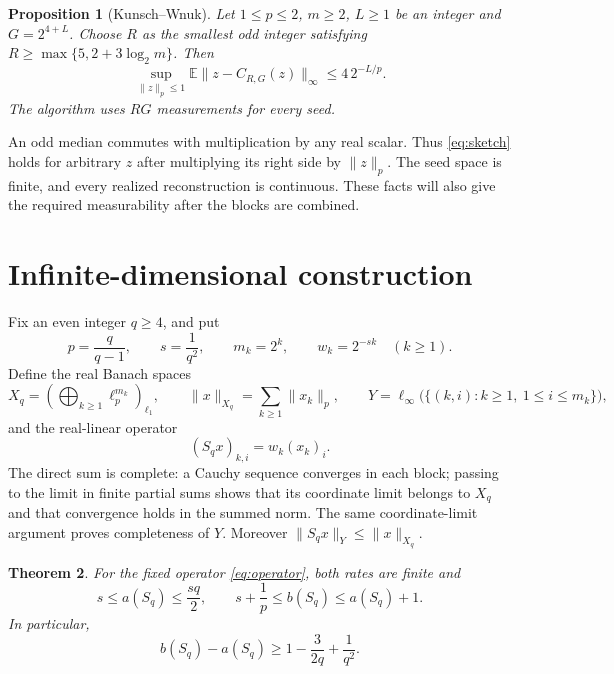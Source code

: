 \documentclass[11pt]{article}
\newtheorem{theorem}{Theorem}
\newtheorem{proposition}[theorem]{Proposition}
\newcommand{\E}{\mathbb E}
\begin{document}
\begin{proposition}[Kunsch--Wnuk]\label{prop:sketch}
Let \(1\le p\le2\), \(m\ge2\), \(L\ge1\) be an integer and \(G=2^{4+L}\).
Choose \(R\) as the smallest odd integer satisfying
\(R\ge\max\{5,2+3\log_2m\}\). Then
\begin{equation}\label{eq:sketch}
 \sup_{\|z\|_p\le1}\E\|z-C_{R,G}(z)\|_\infty
       \le4\,2^{-L/p}.
\end{equation}
The algorithm uses \(RG\) measurements for every seed.
\end{proposition}

An odd median commutes with multiplication by any real scalar.
Thus \eqref{eq:sketch} holds for arbitrary \(z\) after multiplying its
right side by \(\|z\|_p\). The seed space is finite, and every realized
reconstruction is continuous. These facts will also give the required
measurability after the blocks are combined.

\section{Infinite-dimensional construction}

Fix an even integer \(q\ge4\), and put
\[
 p=\frac q{q-1},\qquad s=\frac1{q^2},\qquad
 m_k=2^k,\qquad w_k=2^{-sk}\quad(k\ge1).
\]
Define the real Banach spaces
\[
 X_q=\left(\bigoplus_{k\ge1}\ell_p^{m_k}\right)_{\ell_1},
 \qquad \|x\|_{X_q}=\sum_{k\ge1}\|x_k\|_p,
 \qquad
 Y=\ell_\infty\bigl(\{(k,i):k\ge1,\ 1\le i\le m_k\}\bigr),
\]
and the real-linear operator
\begin{equation}\label{eq:operator}
 (S_qx)_{k,i}=w_k(x_k)_i.
\end{equation}
The direct sum is complete: a Cauchy sequence converges in each block;
passing to the limit in finite partial sums shows that its coordinate
limit belongs to \(X_q\) and that convergence holds in the summed norm.
The same coordinate-limit argument proves completeness of \(Y\).
Moreover \(\|S_qx\|_Y\le\|x\|_{X_q}\).

\begin{theorem}\label{thm:rates}
For the fixed operator \eqref{eq:operator}, both rates are finite and
\begin{equation}\label{eq:rates}
 s\le a(S_q)\le\frac{sq}{2},
 \qquad
 s+\frac1p\le b(S_q)\le a(S_q)+1.
\end{equation}
In particular,
\begin{equation}\label{eq:gain}
 b(S_q)-a(S_q)\ge1-\frac3{2q}+\frac1{q^2}.
\end{equation}
\end{theorem}
\end{document}
